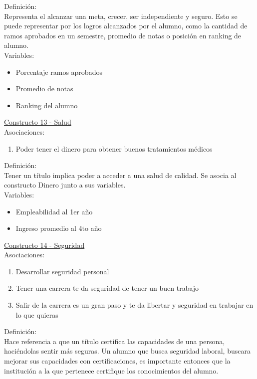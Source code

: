 Definición:\\
Representa el alcanzar una meta, crecer, ser independiente y seguro. Esto se puede representar por los logros alcanzados por el alumno, como la cantidad de ramos aprobados en un semestre, promedio de notas o posición en ranking de alumno.\\

Variables:
\begin{itemize}
	\item Porcentaje ramos aprobados
	\item Promedio de notas
	\item Ranking del alumno	
\end{itemize} 

\underline {Constructo 13 - Salud} \\
Asociaciones:
\begin{enumerate}
	\item Poder tener el dinero para obtener buenos tratamientos médicos		
\end{enumerate}

Definición:\\
Tener un título implica poder a acceder a una salud de calidad. Se asocia al constructo Dinero junto a sus variables.\\

Variables:
\begin{itemize}
	\item Empleabilidad al 1er año
	\item Ingreso promedio al 4to año	
\end{itemize}



\underline {Constructo 14 - Seguridad} \\
Asociaciones:
\begin{enumerate}
	\item Desarrollar seguridad personal
	\item Tener una carrera te da seguridad de tener un buen trabajo	
	\item Salir de la carrera es un gran paso y te da libertar y seguridad en trabajar en lo que quieras
\end{enumerate}

Definición:\\
Hace referencia a que un título certifica las capacidades de una persona, haciéndolas sentir más seguras. Un alumno que busca seguridad laboral, buscara mejorar sus capacidades con certificaciones, es importante entonces que la institución a la que pertenece certifique los conocimientos del alumno.\\

